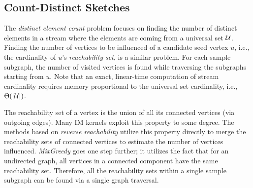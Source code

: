 \subsection{Count-Distinct Sketches}\label{sec:sketch}


The {\em distinct element count} problem focuses on finding the number of distinct elements in a stream where the elements are coming from a universal set ${\cal U}$. Finding the number of vertices to be influenced of a candidate seed vertex $u$, i.e., the cardinality of $u$'s {\em reachability set}, is a similar problem. For each sample subgraph, the number of visited vertices is found while traversing the subgraphs starting from $u$. Note that an exact, linear-time computation of stream cardinality requires memory proportional to the universal set cardinality, i.e., ${\Theta}(|{\cal U}|)$. 

The reachability set of a vertex is the union of all its connected vertices (via outgoing edges). Many IM kernels exploit this property to some degree. The methods based on {\em reverse reachability} \cite{borgs2014maximizing} %
utilize this property directly to merge the reachability sets of connected vertices to estimate the number of vertices influenced. {\em MixGreedy} \cite{MixGreedy} %
goes one step further; it utilizes the fact that for an undirected graph, all vertices in a connected component have the same reachability set. Therefore, all the reachability sets within a single sample subgraph can be found via a single graph traversal. 

